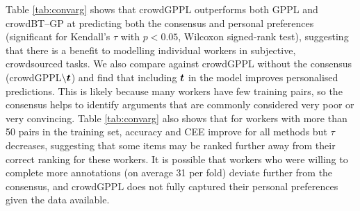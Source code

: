 Table \ref{tab:convarg} shows that 
crowdGPPL outperforms both GPPL and
crowdBT--GP 
at predicting both the consensus and personal preferences
(significant for Kendall's $\tau$ with $p<0.05$, Wilcoxon signed-rank test),
suggesting that there is a benefit
to modelling individual workers in subjective, crowdsourced tasks. 
We also compare against crowdGPPL without the consensus (crowdGPPL$\backslash \boldsymbol t$)
and find that including $\boldsymbol t$ in the model improves personalised
predictions. This is likely because many workers have few training pairs, 
so the consensus helps to identify arguments that are commonly considered very poor or very
convincing.
Table \ref{tab:convarg} also shows that for
workers with more than 50 pairs in the training set,
accuracy and CEE improve for all methods but
$\tau$ decreases,
suggesting that some items may be ranked further away from their correct ranking 
for these workers. It is possible that workers who were willing to complete more
annotations (on average 31 per fold)
deviate further from the consensus, and crowdGPPL does not fully captured 
their personal preferences given the data available.

